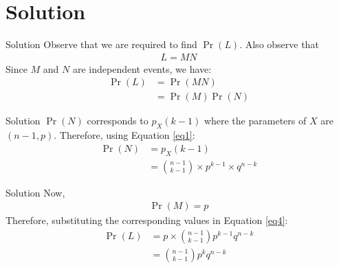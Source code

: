 \documentclass{beamer}
\providecommand{\pr}[1]{\ensuremath{\Pr\left(#1\right)}}
\begin{document}
\section{Solution}
\begin{frame}{Solution}
 Observe that we are required to find $\pr{L}$. Also observe that
 \begin{align}
     L=MN
 \end{align}
 Since $M$ and $N$ are independent events, we have:
  \begin{align}
     \pr{L}&=\pr{MN} \\
            \label{eq4}
           &= \pr{M} \pr{N}
 \end{align}
\end{frame}

\begin{frame}{Solution}
    $\pr{N}$ corresponds to $p_X(k-1)$ where the parameters of $X$ are $(n-1,p)$.
    Therefore, using Equation \ref{eq1}:
    \begin{align}
     \pr{N}&=p_X(k-1) \\
           &= \binom{n-1}{k-1}\times p^{k-1} \times q^{n-k}
 \end{align}
\end{frame}


\begin{frame}{Solution}
Now,
\begin{align}
    \pr{M} = p
\end{align}
Therefore, substituting the corresponding values in Equation \ref{eq4}:
\begin{align}
    \pr{L} &= p \times \binom{n-1}{k-1} p^{k-1}  q^{n-k} \\
           &= \binom{n-1}{k-1} p^{k}  q^{n-k} 
\end{align}
\end{frame}
\end{document}
